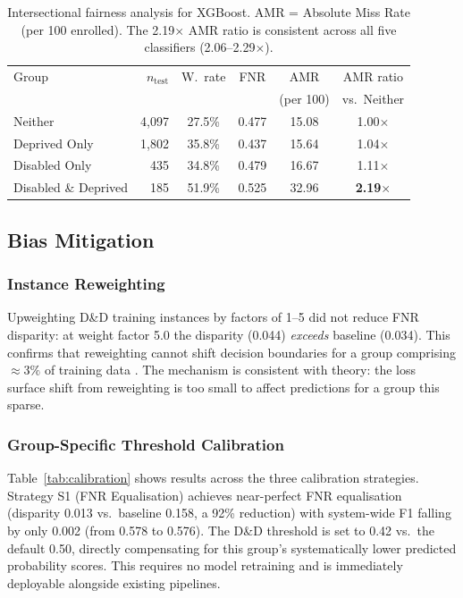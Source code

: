 \documentclass[12pt,a4paper]{article}
\begin{document}
\begin{table}[ht]
\centering
\caption{Intersectional fairness analysis for XGBoost. AMR = Absolute Miss
Rate (per 100 enrolled). The 2.19$\times$ AMR ratio is consistent across all
five classifiers (2.06--2.29$\times$).}
\label{tab:intersectional}
\small
\begin{tabular}{lrcccc}
\toprule
Group & $n_{\text{test}}$ & W.\ rate & FNR & AMR & AMR ratio \\
      &                   &          &     & (per 100) & vs.\ Neither \\
\midrule
Neither              & 4,097 & 27.5\% & 0.477 & 15.08 & 1.00$\times$ \\
Deprived Only        & 1,802 & 35.8\% & 0.437 & 15.64 & 1.04$\times$ \\
Disabled Only        &   435 & 34.8\% & 0.479 & 16.67 & 1.11$\times$ \\
Disabled \& Deprived &   185 & 51.9\% & 0.525 & 32.96 & \textbf{2.19}$\times$ \\
\bottomrule
\end{tabular}
\end{table}

\subsection{Bias Mitigation}

\subsubsection{Instance Reweighting}

Upweighting D\&D training instances by factors of 1--5 did not reduce FNR
disparity: at weight factor 5.0 the disparity (0.044) \textit{exceeds}
baseline (0.034). This confirms that reweighting cannot shift decision
boundaries for a group comprising $\approx 3\%$ of training data
\citep{hardt2016}. The mechanism is consistent with theory: the loss surface
shift from reweighting is too small to affect predictions for a group this
sparse.

\subsubsection{Group-Specific Threshold Calibration}

Table~\ref{tab:calibration} shows results across the three calibration
strategies. Strategy S1 (FNR Equalisation) achieves near-perfect FNR
equalisation (disparity 0.013 vs.\ baseline 0.158, a 92\% reduction) with
system-wide F1 falling by only 0.002 (from 0.578 to 0.576). The D\&D
threshold is set to 0.42 vs.\ the default 0.50, directly compensating for
this group's systematically lower predicted probability scores. This requires
no model retraining and is immediately deployable alongside existing pipelines.
\end{document}
